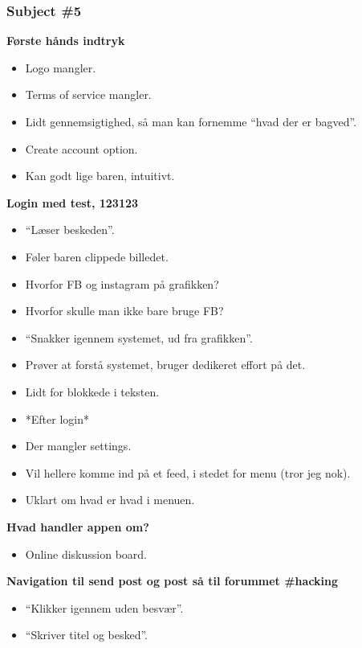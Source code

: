\subsubsection{Subject \#5}

\noindent\textbf{Første hånds indtryk}
\begin{itemize}
    \item Logo mangler.
    \item Terms of service mangler.
    \item Lidt gennemsigtighed, så man kan fornemme “hvad der er bagved”.
    \item Create account option.
    \item Kan godt lige baren, intuitivt.
\end{itemize}

\noindent\textbf{Login med test, 123123}
\begin{itemize}
    \item “Læser beskeden”.
    \item Føler baren clippede billedet.
    \item Hvorfor FB og instagram på grafikken?
    \item Hvorfor skulle man ikke bare bruge FB?
    \item “Snakker igennem systemet, ud fra grafikken”.
    \item Prøver at forstå systemet, bruger dedikeret effort på det.
    \item Lidt for blokkede i teksten.
    \item *Efter login*
    \item Der mangler settings.
    \item Vil hellere komme ind på et feed, i stedet for menu (tror jeg nok).
    \item Uklart om hvad er hvad i menuen.
\end{itemize}

\noindent\textbf{Hvad handler appen om?}
\begin{itemize}
    \item Online diskussion board.
\end{itemize}

\noindent\textbf{Navigation til send post og post så til forummet \#hacking}
\begin{itemize}
    \item “Klikker igennem uden besvær”.
    \item “Skriver titel og besked”.
\end{itemize}

